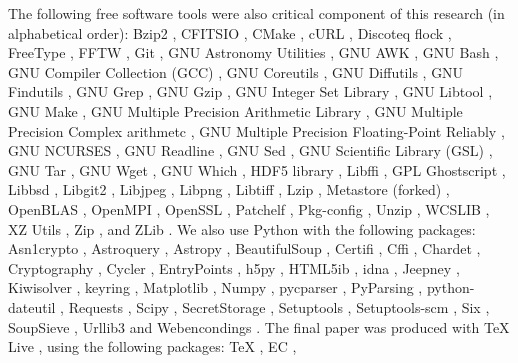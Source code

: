 \documentclass[10pt, twocolumn]{article}
\begin{document}
The following free software tools were also critical component of this
research (in alphabetical order):
Bzip2 \bziptwoversion,
CFITSIO \cfitsioversion,
CMake \cmakeversion,
cURL \curlversion,
Discoteq flock \flockversion,
FreeType \freetypeversion,
FFTW \fftwversion,
Git \gitversion,
GNU Astronomy Utilities \gnuastroversion,
GNU AWK \gawkversion,
GNU Bash \bashversion,
GNU Compiler Collection (GCC) \gccversion,
GNU Coreutils \coreutilsversion,
GNU Diffutils \diffutilsversion,
GNU Findutils \findutilsversion,
GNU Grep \grepversion,
GNU Gzip \gzipversion,
GNU Integer Set Library \islversion,
GNU Libtool \libtoolversion,
GNU Make \makeversion,
GNU Multiple Precision Arithmetic Library \gmpversion,
GNU Multiple Precision Complex arithmetc \mpcversion,
GNU Multiple Precision Floating-Point Reliably \mpfrversion,
GNU NCURSES \ncursesversion,
GNU Readline \readlineversion,
GNU Sed \sedversion,
GNU Scientific Library (GSL) \gslversion,
GNU Tar \tarversion,
GNU Wget \wgetversion,
GNU Which \whichversion,
HDF5 library \hdffiveversion,
Libffi \libffiversion,
GPL Ghostscript \ghostscriptversion,
Libbsd \libbsdversion,
Libgit2 \libgittwoversion,
Libjpeg \libjpegversion,
Libpng \libpngversion,
Libtiff \libtiffversion,
Lzip \lzipversion,
Metastore (forked) \metastoreversion,
OpenBLAS \openblasversion,
OpenMPI \openmpiversion,
OpenSSL \opensslversion,
Patchelf \patchelfversion,
Pkg-config \pkgconfigversion,
Unzip \unzipversion,
WCSLIB \wcslibversion,
XZ Utils \xzversion,
Zip \zipversion,
and
ZLib \zlibversion.
We also use Python {\pythonversion} with the following packages:
Asn1crypto \asncryptoversion,
Astroquery \astroqueryversion,
Astropy {\astropyversion} \citep{astropy2013, astropy2018},
BeautifulSoup \beautifulsoupversion,
Certifi \certifiversion,
Cffi \cffiversion,
Chardet \chardetversion,
Cryptography \cryptographyversion,
Cycler \cyclerversion,
EntryPoints \entrypointsversion,
h5py \hpyversion,
HTML5ib \htmlfivelibversion,
idna \idnaversion,
Jeepney \jeepneyversion,
Kiwisolver \kiwisolverversion,
keyring \keyringversion,
Matplotlib \matplotlibversion,
Numpy \numpyversion,
pycparser \pycparserversion,
PyParsing \pyparsingversion,
python-dateutil \pythondateutilversion,
Requests \requestsversion,
Scipy \scipyversion,
SecretStorage \secretstorageversion,
Setuptools \setuptoolsversion,
Setuptools-scm \setuptoolsscmversion,
Six \sixversion,
SoupSieve \soupsieveversion,
Urllib3 \urllibthreeversion and
Webencondings \webencodingsversion.
The final paper was produced with \TeX{} Live \texliveversion, using the
following packages:
\TeX{} \textexversion,
EC \texecversion,
\end{document}

